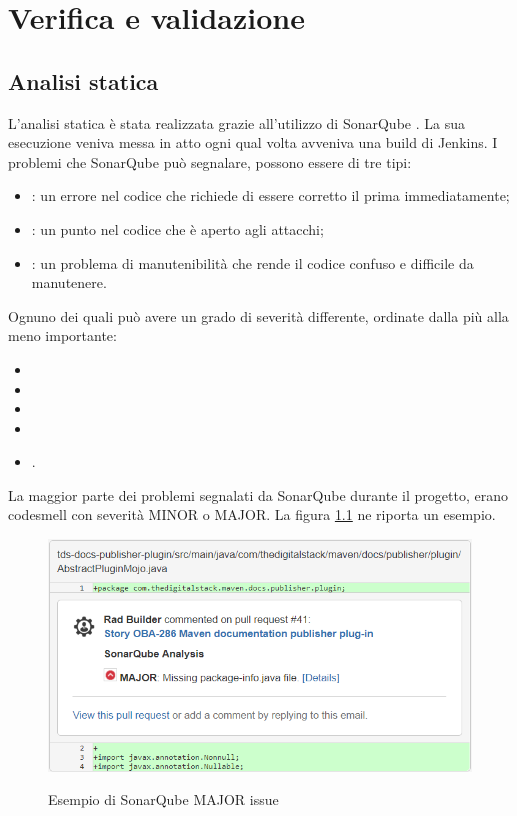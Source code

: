
\chapter{Verifica e validazione}
\label{cap:testing} 

\section{Analisi statica}
L'analisi statica è stata realizzata grazie all'utilizzo di SonarQube \cite{site:sonarqube}.
La sua esecuzione veniva messa in atto ogni qual volta avveniva una build di Jenkins.
I problemi che SonarQube può segnalare, possono essere di tre tipi:
\begin{itemize}
    \item {}: un errore nel codice che richiede di essere corretto il prima immediatamente;
    \item {}: un punto nel codice che è aperto agli attacchi;
    \item {}:  un problema di manutenibilità che rende il codice confuso e difficile da manutenere.
\end{itemize}
Ognuno dei quali può avere un grado di severità differente, ordinate dalla più alla meno importante:
\begin{itemize}
    \item {}
    \item {}
    \item {}
    \item {}
    \item {}.
\end{itemize}

La maggior parte dei problemi segnalati da SonarQube durante il progetto, erano codesmell con severità MINOR o MAJOR.
La figura \ref{sonarMAJORissue} ne riporta un esempio.

\clearpage

\begin{figure}[H]
    \centering
    \includegraphics[width=\textwidth]{immagini/major-issue.png}\\
    \caption{Esempio di SonarQube MAJOR issue}
    \label{sonarMAJORissue}
\end{figure}

